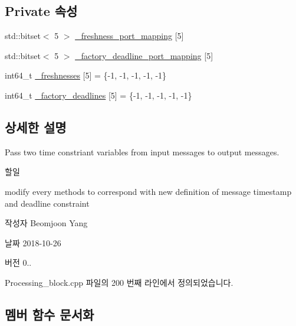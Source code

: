 \subsection*{Private 속성}
\begin{DoxyCompactItemize}
\item 
std\+::bitset$<$ 5 $>$ \hyperlink{classConstraintPassingManager__PB_a34c12f7a79cb6c7a6c68bf63e17fed65}{\+\_\+freshness\+\_\+port\+\_\+mapping} \mbox{[}5\mbox{]}
\item 
std\+::bitset$<$ 5 $>$ \hyperlink{classConstraintPassingManager__PB_ac9c7c8ece56f6b66647da4793fdbcdd5}{\+\_\+factory\+\_\+deadline\+\_\+port\+\_\+mapping} \mbox{[}5\mbox{]}
\item 
int64\+\_\+t \hyperlink{classConstraintPassingManager__PB_ab06613fe88e472ed575a09e32d60bf67}{\+\_\+freshnesses} \mbox{[}5\mbox{]} = \{-\/1, -\/1, -\/1, -\/1, -\/1\}
\item 
int64\+\_\+t \hyperlink{classConstraintPassingManager__PB_a1a7e67da1e921de5f66eb9bf676ea945}{\+\_\+factory\+\_\+deadlines} \mbox{[}5\mbox{]} = \{-\/1, -\/1, -\/1, -\/1, -\/1\}
\end{DoxyCompactItemize}


\subsection{상세한 설명}
Pass two time constriant variables from input messages to output messages. 

\begin{DoxyRefDesc}{할일}
\item[\hyperlink{todo__todo000003}{할일}]modify every methods to correspond with new definition of message timestamp and deadline constraint \end{DoxyRefDesc}
\begin{DoxyAuthor}{작성자}
Beomjoon Yang 
\end{DoxyAuthor}
\begin{DoxyDate}{날짜}
2018-\/10-\/26 
\end{DoxyDate}
\begin{DoxyVersion}{버전}
0.. 
\end{DoxyVersion}


Processing\+\_\+block.\+cpp 파일의 200 번째 라인에서 정의되었습니다.



\subsection{멤버 함수 문서화}

